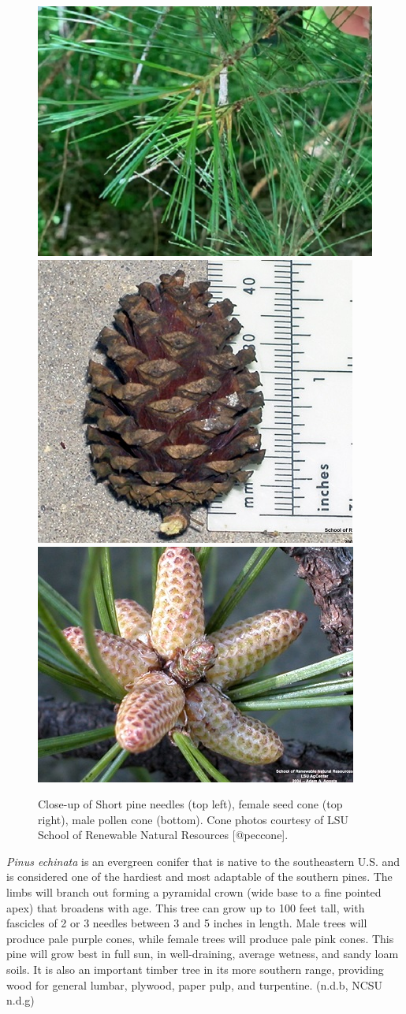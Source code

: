 \documentclass[
]{article}
\begin{document}
\begin{figure}

{\centering \includegraphics[width=0.5\linewidth]{shortpine} \includegraphics[width=0.5\linewidth]{pinecfe} \includegraphics[width=0.5\linewidth]{pinecma} 

}

\caption{Close-up of Short pine needles (top left), female seed cone (top right), male pollen cone (bottom). Cone photos courtesy of LSU School of Renewable Natural Resources [@peccone].}\label{fig:shpine}
\end{figure}

\emph{Pinus echinata} is an evergreen conifer that is native to the southeastern U.S. and is considered one of the hardiest and most adaptable of the southern pines. The limbs will branch out forming a pyramidal crown (wide base to a fine pointed apex) that broadens with age. This tree can grow up to 100 feet tall, with fascicles of 2 or 3 needles between 3 and 5 inches in length. Male trees will produce pale purple cones, while female trees will produce pale pink cones. This pine will grow best in full sun, in well-draining, average wetness, and sandy loam soils. It is also an important timber tree in its more southern range, providing wood for general lumbar, plywood, paper pulp, and turpentine. (n.d.b, NCSU n.d.g)
\end{document}
